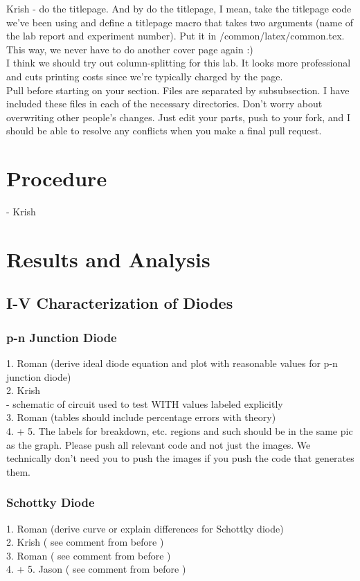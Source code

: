 \documentclass{article}
\newcommand{\subcom}{( see comment from before )}
\begin{document}
	\begin{multicols}{2}
	Krish - do the titlepage. And by do the titlepage, I mean, take the titlepage code we've been using and define a titlepage macro that takes two arguments (name of the lab report and experiment number). Put it in /common/latex/common.tex. This way, we never have to do another cover page again :) \\
	I think we should try out column-splitting for this lab. It looks more professional and cuts printing costs since we're typically charged by the page. \\
	Pull before starting on your section. Files are separated by subsubsection. I have included these files in each of the necessary directories. Don't worry about overwriting other people's changes. Just edit your parts, push to your fork, and I should be able to resolve any conflicts when you make a final pull request. \\
	\section{Procedure}
		- Krish
	\section{Results and Analysis}
		\subsection{I-V Characterization of Diodes}
			\subsubsection{p-n Junction Diode}
				1. Roman (derive ideal diode equation and plot with reasonable values for p-n junction diode) \\
				2. Krish \\
					- schematic of circuit used to test WITH values labeled explicitly \\
				3. Roman (tables should include percentage errors with theory) \\
				4. + 5. The labels for breakdown, etc. regions and such should be in the same pic as the graph. Please push all relevant code and not just the images. We technically don't need you to push the images if you push the code that generates them. \\
			\subsubsection{Schottky Diode}
				1. Roman (derive curve or explain differences for Schottky diode) \\
				2. Krish \subcom \\
				3. Roman \subcom \\
				4. + 5. Jason \subcom \\

\end{multicols}
\end{document}
